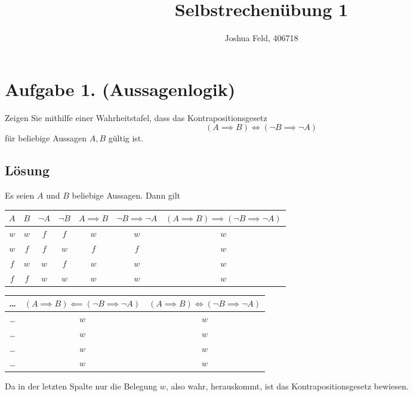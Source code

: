 \documentclass[german,12pt]{homework}
\title{Selbstrechenübung 1}
\author{Joshua Feld, 406718}
\institute{RWTH Aachen University\\Center for Computational Engineering Science}
\begin{document}
    \maketitle

    \section*{Aufgabe 1. (Aussagenlogik)}

    \begin{problem}
        Zeigen Sie mithilfe einer Wahrheitstafel, dass das Kontrapositionsgesetz
        \[\left(A \implies B\right) \iff \left(\lnot{B} \implies \lnot{A}\right)\]
        für beliebige Aussagen \(A, B\) gültig ist.
    \end{problem}

    \subsection*{Lösung} Es seien \(A\) und \(B\) beliebige Aussagen. Dann gilt
    \begin{center}
        \begin{tabular}{ccccccc}
            \toprule
            \(A\) & \(B\) & \(\lnot{A}\) & \(\lnot{B}\) & \(A \implies B\) & \(\lnot{B} \implies \lnot{A}\) & \(\left(A \implies B\right) \implies \left(\lnot{B} \implies \lnot{A}\right)\)\\
            \midrule
            \(w\) & \(w\) & \(f\) & \(f\) & \(w\) & \(w\) & \(w\)\\
            \(w\) & \(f\) & \(f\) & \(w\) & \(f\) & \(f\) & \(w\)\\
            \(f\) & \(w\) & \(w\) & \(f\) & \(w\) & \(w\) & \(w\)\\
            \(f\) & \(f\) & \(w\) & \(w\) & \(w\) & \(w\) & \(w\)\\
            \bottomrule
        \end{tabular}

        \vspace{.2in}

        \begin{tabular}{ccc}
            \toprule
            \ldots & \(\left(A \implies B\right) \impliedby \left(\lnot{B} \implies \lnot{A}\right)\) & \(\left(A \implies B\right) \iff \left(\lnot{B} \implies \lnot{A}\right)\)\\
            \midrule
            \ldots & \(w\) & \(w\)\\
            \ldots & \(w\) & \(w\)\\
            \ldots & \(w\) & \(w\)\\
            \ldots & \(w\) & \(w\)\\
            \bottomrule
        \end{tabular}
    \end{center}
    Da in der letzten Spalte nur die Belegung \(w\), also wahr, herauskommt, ist das Kontrapositionsgesetz bewiesen.
\end{document}
